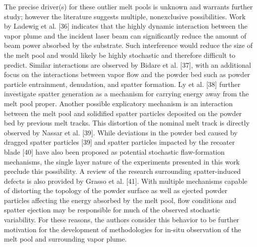 \documentclass[10pt]{article}
\begin{document}
The precise driver(s) for these outlier melt pools is unknown and warrants further study; however the literature suggests multiple, nonexclusive possibilities. Work by Ladewig et al. [36] indicates that the highly dynamic interaction between the vapor plume and the incident laser beam can significantly reduce the amount of beam power absorbed by the substrate. Such interference would reduce the size of the melt pool and would likely be highly stochastic and therefore difficult to predict. Similar interactions are observed by Bidare et al. [37], with an additional focus on the interactions between vapor flow and the powder bed such as powder particle entrainment, denudation, and spatter formation. Ly et al. [38] further investigate spatter generation as a mechanism for carrying energy away from the melt pool proper. Another possible explicatory mechanism is an interaction between the melt pool and solidified spatter particles deposited on the powder bed by previous melt tracks. This distortion of the nominal melt track is directly observed by Nassar et al. [39]. While deviations in the powder bed caused by dragged spatter particles [39] and spatter particles impacted by the recoater blade [40] have also been proposed as potential stochastic flaw-formation mechanisms, the single layer nature of the experiments presented in this work preclude this possibility. A review of the research surrounding spatter-induced defects is also provided by Grasso et al. [41]. With multiple mechanisms capable of distorting the topology of the powder surface as well as ejected powder particles affecting the energy absorbed by the melt pool, flow conditions and spatter ejection may be responsible for much of the observed stochastic variability. For these reasons, the authors consider this behavior to be further motivation for the development of methodologies for in-situ observation of the melt pool and surrounding vapor plume.
\end{document}
